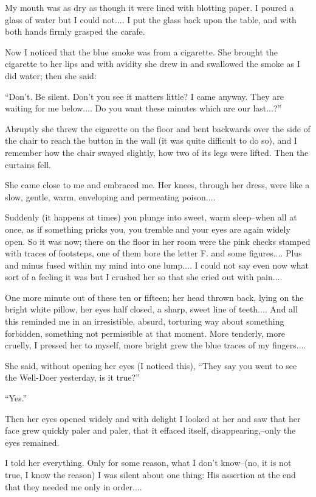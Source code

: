 \documentclass[11pt,openany]{book}
\begin{document}
My mouth was as dry as though it were lined with blotting paper. I poured a glass of water but I could not.... I put the glass back upon the table, and with both hands firmly grasped the carafe.

Now I noticed that the blue smoke was from a cigarette. She brought the cigarette to her lips and with avidity she drew in and swallowed the smoke as I did water; then she said:

``Don't. Be silent. Don't you see it matters little? I came anyway. They are waiting for me below.... Do you want these minutes which are our last...?''

Abruptly she threw the cigarette on the floor and bent backwards over the side of the chair to reach the button in the wall (it was quite difficult to do so), and I remember how the chair swayed slightly, how two of its legs were lifted. Then the curtains fell.

She came close to me and embraced me. Her knees, through her dress, were like a slow, gentle, warm, enveloping and permeating poison....

Suddenly (it happens at times) you plunge into sweet, warm sleep--when all at once, as if something pricks you, you tremble and your eyes are again widely open. So it was now; there on the floor in her room were the pink checks stamped with traces of footsteps, one of them bore the letter F. and some figures.... Plus and minus fused within my mind into one lump.... I could not say even now what sort of a feeling it was but I crushed her so that she cried out with pain....

One more minute out of these ten or fifteen; her head thrown back, lying on the bright white pillow, her eyes half closed, a sharp, sweet line of teeth.... And all this reminded me in an irresistible, absurd, torturing way about something forbidden, something not permissible at that moment. More tenderly, more cruelly, I pressed her to myself, more bright grew the blue traces of my fingers....

She said, without opening her eyes (I noticed this), ``They say you went to see the Well-Doer yesterday, is it true?''

``Yes.''

Then her eyes opened widely and with delight I looked at her and saw that her face grew quickly paler and paler, that it effaced itself, disappearing,--only the eyes remained.

I told her everything. Only for some reason, what I don't know--(no, it is not true, I know the reason) I was silent about one thing: His assertion at the end that they needed me only in order....
\end{document}
